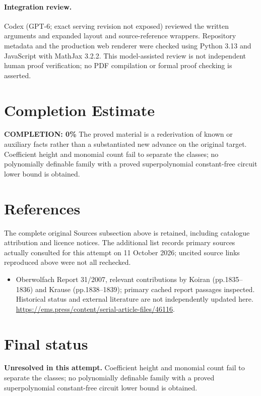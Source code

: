 \documentclass[11pt]{article}
\begin{document}
\paragraph{Integration review.} Codex (GPT-6; exact serving revision not exposed) reviewed the written arguments and expanded layout and source-reference wrappers. Repository metadata and the production web renderer were checked using Python 3.13 and JavaScript with MathJax 3.2.2. This model-assisted review is not independent human proof verification; no PDF compilation or formal proof checking is asserted.

\section{Completion Estimate}
\noindent\textbf{COMPLETION: 0\%}
The proved material is a rederivation of known or auxiliary facts rather than a substantiated new advance on the original target. Coefficient height and monomial count fail to separate the classes; no polynomially definable family with a proved superpolynomial constant-free circuit lower bound is obtained.
\section{References}
The complete original Sources subsection above is retained, including catalogue attribution and licence notices. The additional list records primary sources actually consulted for this attempt on 11 October 2026; uncited source links reproduced above were not all rechecked.
\begin{itemize}
\item Oberwolfach Report 31/2007, relevant contributions by Koiran (pp.1835--1836) and Krause (pp.1838--1839); primary cached report passages inspected. Historical status and external literature are not independently updated here. \url{https://ems.press/content/serial-article-files/46116}.
\end{itemize}
\section{Final status}
\textbf{Unresolved in this attempt.} Coefficient height and monomial count fail to separate the classes; no polynomially definable family with a proved superpolynomial constant-free circuit lower bound is obtained.
\end{document}
